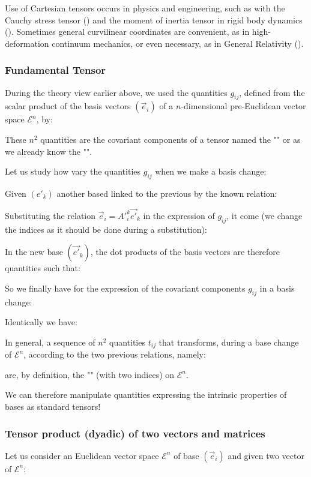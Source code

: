 	Use of Cartesian tensors occurs in physics and engineering, such as with the Cauchy stress tensor () and the moment of inertia tensor in rigid body dynamics (). Sometimes general curvilinear coordinates are convenient, as in high-deformation continuum mechanics, or even necessary, as in General Relativity ().
	
	\subsubsection{Fundamental Tensor}
	During the theory view earlier above, we used the quantities $g_{ij}$, defined from the scalar product of the basis vectors $(\vec{e}_i)$ of a $n$-dimensional pre-Euclidean  vector space $\mathcal{E}^n$, by:
	
	These $n^2$ quantities are the covariant components of a tensor named the "" or as we already know the "".
	
	Let us study how vary the quantities $g_{ij}$ when we make a basis change:

	Given $({e'}_k)$ another based linked to the previous by the known relation:
	
	Substituting the relation $\vec{e}_i={A'}_i^k\vec{e'}_k$ in the expression of $g_{ij}$, it come (we change the indices as it should be done during a substitution):
	
	In the new base $(\vec{e'}_k)$, the dot products of the basis vectors are therefore quantities such that:
	
	So we finally have for the expression of the covariant components $g_{ij}$ in a basis change:
	
	Identically we have:
	
	In general, a sequence of $n^2$ quantities $t_{ij}$ that transforms, during a base change of $\mathcal{E}^n$, according to the two previous relations, namely:
	
	are, by definition, the "" (with two indices) on $\mathcal{E}^n$.

	We can therefore manipulate quantities expressing the intrinsic properties of bases as standard tensors!
	
	\subsubsection{Tensor product (dyadic) of two vectors and matrices}\label{tensor product}
	Let us consider an Euclidean vector space $\mathcal{E}^n$ of base $(\vec{e}_i)$ and given two vector of $\mathcal{E}^n$:
	
